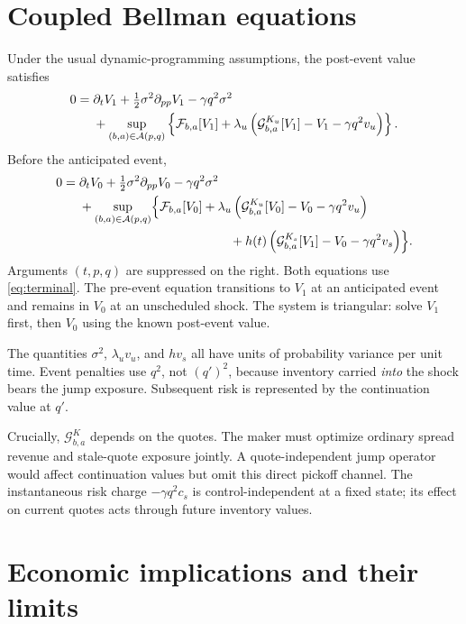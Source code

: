 \documentclass[11pt]{article}
\newcommand{\1}{\mathbf 1}
\newcommand{\F}{\mathcal F}
\newcommand{\G}{\mathcal G}
\newcommand{\A}{\mathcal A}
\begin{document}
\section{Coupled Bellman equations}
Under the usual dynamic-programming assumptions, the post-event value satisfies
\begin{align}
 0={}&\partial_t V_1+\tfrac12\sigma^2\partial_{pp}V_1-\gamma q^2\sigma^2
 \notag\\
 &+\sup_{(b,a)\in\A(p,q)}\left\{
 \F_{b,a}[V_1]+\lambda_u\left(
 \G^{K_u}_{b,a}[V_1]-V_1-\gamma q^2v_u\right)\right\}.
 \label{eq:post}
\end{align}
Before the anticipated event,
\begin{align}
 0={}&\partial_t V_0+\tfrac12\sigma^2\partial_{pp}V_0-\gamma q^2\sigma^2
 \notag\\
 &+\sup_{(b,a)\in\A(p,q)}\Bigl\{
 \F_{b,a}[V_0]+\lambda_u\left(
 \G^{K_u}_{b,a}[V_0]-V_0-\gamma q^2v_u\right)
 \notag\\
 &\hspace{42mm}+h(t)\left(
 \G^{K_s}_{b,a}[V_1]-V_0-\gamma q^2v_s\right)\Bigr\}.
 \label{eq:pre}
\end{align}
Arguments $(t,p,q)$ are suppressed on the right. Both equations use
\eqref{eq:terminal}. The pre-event equation transitions to $V_1$ at an
anticipated event and remains in $V_0$ at an unscheduled shock. The system is
triangular: solve $V_1$ first, then $V_0$ using the known post-event value.

The quantities $\sigma^2$, $\lambda_uv_u$, and $h v_s$ all have units of
probability variance per unit time. Event penalties use $q^2$, not $(q')^2$,
because inventory carried \emph{into} the shock bears the jump exposure.
Subsequent risk is represented by the continuation value at $q'$.

Crucially, $\G_{b,a}^K$ depends on the quotes. The maker must optimize ordinary
spread revenue and stale-quote exposure jointly. A quote-independent jump
operator would affect continuation values but omit this direct pickoff channel.
The instantaneous risk charge $-\gamma q^2c_s$ is control-independent at a
fixed state; its effect on current quotes acts through future inventory values.

\section{Economic implications and their limits}
\end{document}
